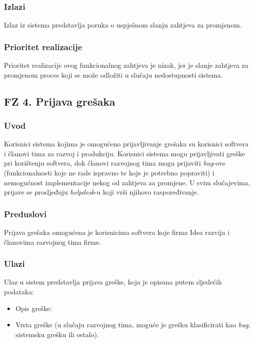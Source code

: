 \documentclass[12pt,a4paper]{article}
\begin{document}
\subsubsection{Izlazi}

Izlaz iz sistema predstavlja poruka o uspješnom slanju zahtjeva za promjenom.

\subsubsection{Prioritet realizacije}

Prioritet realizacije ovog funkcionalnog zahtjeva je nizak, jer je slanje zahtjeva za promjenom proces koji se može odložiti u slučaju nedostupnosti sistema.

\newpage

\subsection{FZ 4. Prijava grešaka}

\subsubsection{Uvod}

Korisnici sistema kojima je omogućeno prijavljivanje grešaka su korisnici softvera i članovi tima za razvoj i produkciju. Korisnici sistema mogu prijavljivati greške pri korištenju softvera, dok članovi razvojnog tima mogu prijaviti \textit{bug}-ove (funkcionalnosti koje ne rade ispravno te koje je potrebno popraviti) i nemogućnost implementacije nekog od zahtjeva za promjene. U svim slučajevima, prijave se prosljeđuju \textit{helpdesk}-u koji vrši njihovo raspoređivanje.

\subsubsection{Preduslovi}

Prijava grešaka omogućena je korisnicima softvera koje firma Idea razvija i članovima razvojnog tima firme.

\subsubsection{Ulazi}

Ulaz u sistem predstavlja prijava greške, koja je opisana putem sljedećih podataka:

\begin{itemize}
\item Opis greške:
\item Vrsta greške (u slučaju razvojnog tima, moguće je grešku klasificirati kao \textit{bug}, sistemsku grešku ili ostalo).
\end{itemize}
\end{document}
